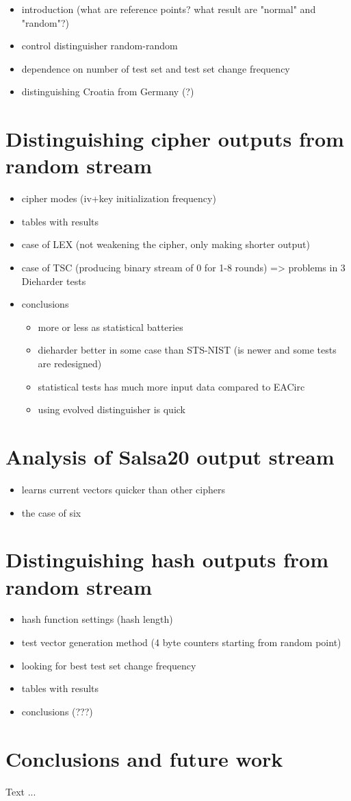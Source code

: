 \documentclass[12pt,oneside]{fithesis2}
\begin{document}
\begin{itemize}
\item introduction (what are reference points? what result are "normal" and "random"?)
\item control distinguisher random-random
\item dependence on number of test set and test set change frequency
\item distinguishing Croatia from Germany (?)
\end{itemize}

\chapter{Distinguishing cipher outputs from random stream}
\label{chap:distinguish-cipher}

\begin{itemize}
\item cipher modes (iv+key initialization frequency)
\item tables with results
\item case of LEX (not weakening the cipher, only making shorter output)
\item case of TSC (producing binary stream of 0 for 1-8 rounds) => problems in 3 Dieharder tests
\item conclusions
\begin{itemize}
\item more or less as statistical batteries
\item dieharder better in some case than STS-NIST (is newer and some tests are redesigned)
\item statistical tests has much more input data compared to EACirc
\item using evolved distinguisher is quick
\end{itemize}
\end{itemize}

\chapter{Analysis of Salsa20 output stream}
\label{chap:analysis-salsa}
\begin{itemize}
\item learns current vectors quicker than other ciphers
\item the case of six
\end{itemize}

\chapter{Distinguishing hash outputs from random stream}
\label{chap:distinguish-hash}
\begin{itemize}
\item hash function settings (hash length)
\item test vector generation method (4 byte counters starting from random point)
\item looking for best test set change frequency
\item tables with results
\item conclusions (???)
\end{itemize}

\chapter{Conclusions and future work}
\label{chap:conclusions}
Text ...
\end{document}
